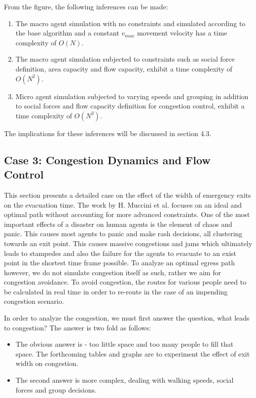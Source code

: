 From the figure, the following inferences can be made:

\begin{enumerate}
  \item The macro agent simulation with no constraints and simulated according to the base algorithm and a constant $v_{max}$ movement velocity has a time complexity of $O(N)$.
  \item The macro agent simulation subjected to constraints such as social force definition, area capacity and flow capacity, exhibit a time complexity of $O(N^2)$.
  \item Micro agent simulation subjected to varying speeds and grouping in addition to social forces and flow capacity definition for congestion control, exhibit a time complexity of $O(N^3)$.
\end{enumerate}

The implications for these inferences will be discussed in section 4.3.


\subsection{Case 3: Congestion Dynamics and Flow Control}
\label{sec: Case 3: Congestion Dynamics and Flow Control}

This section presents a detailed case on the effect of the width of emergency exits on the evacuation time. The work by H. Muccini et al. \cite{ref5} focuses on an ideal and optimal path without accounting for more advanced constraints. One of the most important effects of a disaster on human agents is the element of chaos and panic. This causes most agents to panic and make rash decisions, all clustering towards an exit point. This causes massive congestions and jams which ultimately leads to stampedes and also the failure for the agents to evacuate to an exist point in the shortest time frame possible. To analyze an optimal egress path however, we do not simulate congestion itself as such, rather we aim for congestion avoidance. To avoid congestion, the routes for various people need to be calculated in real time in order to re-route in the case of an impending congestion scenario.

In order to analyze the congestion, we must first answer the question, what leads to congestion? The answer is two fold as follows:
\begin{itemize}
  \item The obvious answer is - too little space and too many people to fill that space. The forthcoming tables and graphs are to experiment the effect of exit width on congestion.
  \item The second answer is more complex, dealing with walking speeds, social forces and group decisions. 
\end{itemize}

